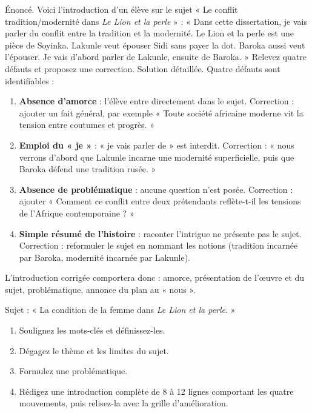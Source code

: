 \documentclass[11pt]{article}
\begin{document}
\begin{exoresolu}
Énoncé. Voici l'introduction d'un élève sur le sujet « Le conflit tradition/modernité dans \emph{Le Lion et la perle} » : « Dans cette dissertation, je vais parler du conflit entre la tradition et la modernité. Le Lion et la perle est une pièce de Soyinka. Lakunle veut épouser Sidi sans payer la dot. Baroka aussi veut l'épouser. Je vais d'abord parler de Lakunle, ensuite de Baroka. » Relevez quatre défauts et proposez une correction.
\tcblower
Solution détaillée. Quatre défauts sont identifiables :
\begin{enumerate}
\item \textbf{Absence d'amorce} : l'élève entre directement dans le sujet. Correction : ajouter un fait général, par exemple « Toute société africaine moderne vit la tension entre coutumes et progrès. »
\item \textbf{Emploi du « je »} : « je vais parler de » est interdit. Correction : « nous verrons d'abord que Lakunle incarne une modernité superficielle, puis que Baroka défend une tradition rusée. »
\item \textbf{Absence de problématique} : aucune question n'est posée. Correction : ajouter « Comment ce conflit entre deux prétendants reflète-t-il les tensions de l'Afrique contemporaine ? »
\item \textbf{Simple résumé de l'histoire} : raconter l'intrigue ne présente pas le sujet. Correction : reformuler le sujet en nommant les notions (tradition incarnée par Baroka, modernité incarnée par Lakunle).
\end{enumerate}
L'introduction corrigée comportera donc : amorce, présentation de l'œuvre et du sujet, problématique, annonce du plan au « nous ».
\end{exoresolu}

\begin{exercice}
Sujet : « La condition de la femme dans \emph{Le Lion et la perle}. »
\begin{enumerate}
\item Soulignez les mots-clés et définissez-les.
\item Dégagez le thème et les limites du sujet.
\item Formulez une problématique.
\item Rédigez une introduction complète de 8 à 12 lignes comportant les quatre mouvements, puis relisez-la avec la grille d'amélioration.
\end{enumerate}
\end{exercice}
\end{document}
